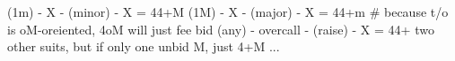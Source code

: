 (1m) - X - (minor) - X = 44+M
(1M) - X - (major) - X = 44+m  # because t/o is oM-oreiented, 4oM will just fee bid
(any) - overcall - (raise) - X = 44+ two other suits, but if only one unbid M, just 4+M
...
